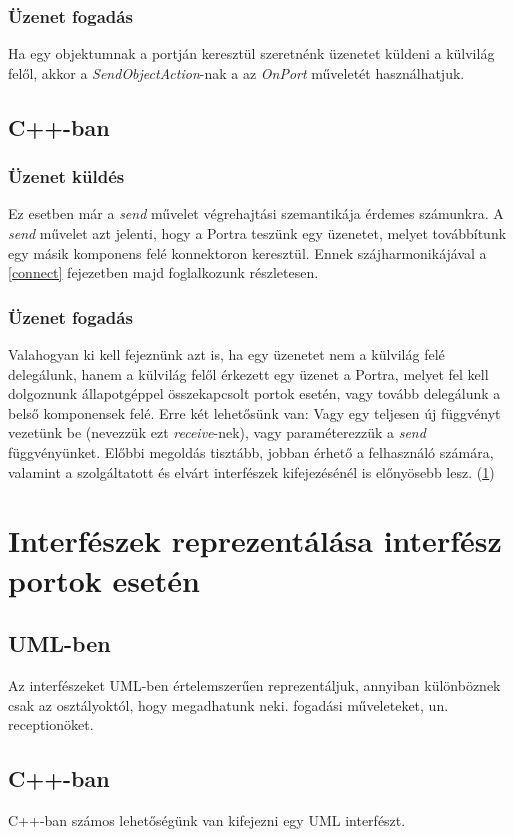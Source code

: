 \documentclass[a4paper,12pt]{report}
\begin{document}
\subsubsection{Üzenet fogadás}
Ha egy objektumnak a portján keresztül szeretnénk üzenetet küldeni a külvilág felől, akkor a \textit{SendObjectAction}-nak a az \textit{OnPort} műveletét használhatjuk. 

\subsection{C++-ban}
\subsubsection{Üzenet küldés}
Ez esetben már a \textit{send} művelet végrehajtási szemantikája érdemes számunkra. A \textit{send} művelet azt jelenti, hogy a Portra teszünk egy üzenetet, melyet továbbítunk egy másik komponens felé konnektoron keresztül. Ennek szájharmonikájával a \ref{connect} fejezetben majd foglalkozunk részletesen.

\subsubsection{Üzenet fogadás}
Valahogyan ki kell fejeznünk azt is, ha egy üzenetet nem a külvilág felé delegálunk, hanem a külvilág felől érkezett egy üzenet a Portra, melyet fel kell dolgoznunk állapotgéppel összekapcsolt portok esetén, vagy tovább delegálunk a belső komponensek felé. Erre két lehetősünk van: Vagy egy teljesen új függvényt vezetünk be (nevezzük ezt \textit{receive}-nek), vagy paraméterezzük a \textit{send} függvényünket. Előbbi megoldás tisztább, jobban érhető a felhasználó számára, valamint a szolgáltatott és elvárt interfészek kifejezésénél is előnyösebb lesz. (\ref{inf})

\section{Interfészek reprezentálása interfész portok esetén} \label{inf}
\subsection{UML-ben}
Az interfészeket UML-ben értelemszerűen reprezentáljuk, annyiban különböznek csak az osztályoktól, hogy megadhatunk neki. fogadási műveleteket, un. receptionöket.

\subsection{C++-ban}
C++-ban számos lehetőségünk van kifejezni egy UML interfészt.
\end{document}
